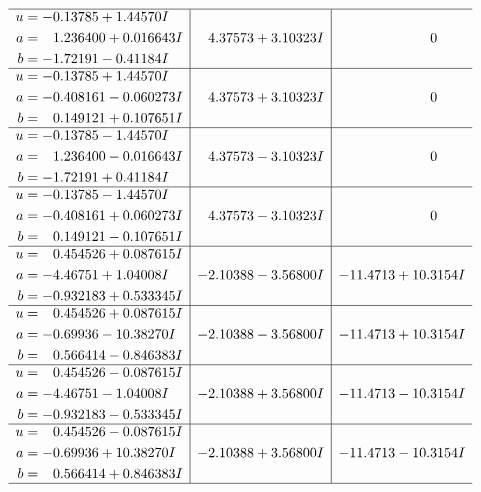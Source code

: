 \documentclass[1p]{elsarticle_modified}
\theoremstyle{definition}
\begin{document}
$$\begin{array}{c|c|c}
 \hline 
\begin{aligned}
u &= -0.13785 + 1.44570 I \\
a &= \phantom{-}1.236400 + 0.016643 I \\
b &= -1.72191 - 0.41184 I\end{aligned}
 & \phantom{-}4.37573 + 3.10323 I & \phantom{-0.000000 } 0 \\ \hline\begin{aligned}
u &= -0.13785 + 1.44570 I \\
a &= -0.408161 - 0.060273 I \\
b &= \phantom{-}0.149121 + 0.107651 I\end{aligned}
 & \phantom{-}4.37573 + 3.10323 I & \phantom{-0.000000 } 0 \\ \hline\begin{aligned}
u &= -0.13785 - 1.44570 I \\
a &= \phantom{-}1.236400 - 0.016643 I \\
b &= -1.72191 + 0.41184 I\end{aligned}
 & \phantom{-}4.37573 - 3.10323 I & \phantom{-0.000000 } 0 \\ \hline\begin{aligned}
u &= -0.13785 - 1.44570 I \\
a &= -0.408161 + 0.060273 I \\
b &= \phantom{-}0.149121 - 0.107651 I\end{aligned}
 & \phantom{-}4.37573 - 3.10323 I & \phantom{-0.000000 } 0 \\ \hline\begin{aligned}
u &= \phantom{-}0.454526 + 0.087615 I \\
a &= -4.46751 + 1.04008 I \\
b &= -0.932183 + 0.533345 I\end{aligned}
 & -2.10388 - 3.56800 I & -11.4713 + 10.3154 I \\ \hline\begin{aligned}
u &= \phantom{-}0.454526 + 0.087615 I \\
a &= -0.69936 - 10.38270 I \\
b &= \phantom{-}0.566414 - 0.846383 I\end{aligned}
 & -2.10388 - 3.56800 I & -11.4713 + 10.3154 I \\ \hline\begin{aligned}
u &= \phantom{-}0.454526 - 0.087615 I \\
a &= -4.46751 - 1.04008 I \\
b &= -0.932183 - 0.533345 I\end{aligned}
 & -2.10388 + 3.56800 I & -11.4713 - 10.3154 I \\ \hline\begin{aligned}
u &= \phantom{-}0.454526 - 0.087615 I \\
a &= -0.69936 + 10.38270 I \\
b &= \phantom{-}0.566414 + 0.846383 I\end{aligned}
 & -2.10388 + 3.56800 I & -11.4713 - 10.3154 I\\
 \hline 
 \end{array}$$\newpage\newpage\renewcommand{\arraystretch}{1}
\end{document}
